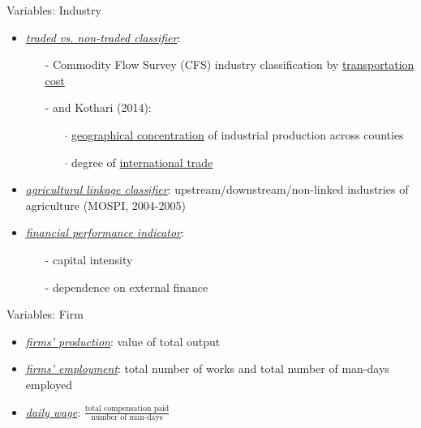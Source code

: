  \begin{frame}{Variables: Industry}
    \begin{itemize}
        \item<1-> \underline{\textit{traded vs. non-traded classifier}}:
        \begin{itemize}
            \item[-] \citet{holmes2014alternative} Commodity Flow Survey (CFS) industry classification by \textcolor{mygreen}{\underline{transportation cost}}
            \item[-] \citet{mian2014explains} and Kothari (2014):
             \begin{itemize}
                \item[$\cdot$] \textcolor{mygreen}{\underline{geographical concentration}} of industrial production across counties
                \item[$\cdot$] degree of \textcolor{mygreen}{\underline{international trade}} 
             \end{itemize}
        \end{itemize}
        \item<2-> \underline{\textit{agricultural linkage classifier}}: upstream/downstream/non-linked industries of agriculture (MOSPI, 2004-2005) %
        \item<3-> \underline{\textit{financial performance indicator}}:
        \begin{itemize}
            \item[-] capital intensity
            \item[-] dependence on external finance
        \end{itemize}
    \end{itemize}

 \end{frame}

 \begin{frame}{Variables: Firm}
    \begin{itemize}
        \item<1-> \underline{\textit{firms' production}}: value of total output
        \item<1-> \underline{\textit{firms' employment}}: total number of works and total number of man-days employed
        \item<1-> \underline{\textit{daily wage}}: $\frac{\text{total compensation paid}}{\text{number of man-days}}$
    \end{itemize}

 \end{frame}

